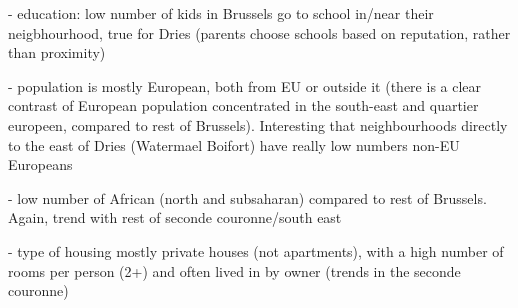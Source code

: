 \documentclass{article}
\begin{document}
- education: low number of kids in Brussels go to school in/near their neigbhourhood, true for Dries (parents choose schools based on reputation, rather than proximity)

- population is mostly European, both from EU or outside it (there is a clear contrast of European population concentrated in the south-east and quartier europeen, compared to rest of Brussels). Interesting that neighbourhoods directly to the east of Dries (Watermael Boifort) have really low numbers non-EU Europeans

- low number of African (north and subsaharan) compared to rest of Brussels. Again, trend with rest of seconde couronne/south east 

- type of housing mostly private houses (not apartments), with a high number of rooms per person (2+) and often lived in by owner (trends in the seconde couronne)
\end{document}
